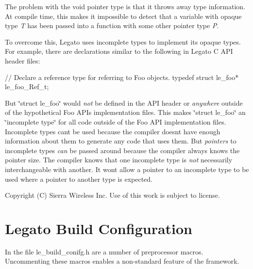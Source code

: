 The problem with the void pointer type is that it throws away type information. At compile time, this makes it impossible to detect that a variable with opaque type {\itshape T} has been passed into a function with some other pointer type {\itshape P}.

To overcome this, Legato uses incomplete types to implement its opaque types. For example, there are declarations similar to the following in Legato C A\+P\+I header files\+:


\begin{DoxyCode}
\textcolor{comment}{// Declare a reference type for referring to Foo objects.}
\textcolor{keyword}{typedef} \textcolor{keyword}{struct }le\_foo* le\_foo\_Ref\_t;
\end{DoxyCode}


But \char`\"{}struct le\+\_\+foo\char`\"{} would {\itshape not} be defined in the A\+P\+I header or {\itshape anywhere} outside of the hypothetical Foo A\+P\+I\textquotesingle{}s implementation files. This makes \char`\"{}struct le\+\_\+foo\char`\"{} an \char`\"{}incomplete type\char`\"{} for all code outside of the Foo A\+P\+I implementation files. Incomplete types can\textquotesingle{}t be used because the compiler doesn\textquotesingle{}t have enough information about them to generate any code that uses them. But {\itshape pointers} to incomplete types {\itshape can} be passed around because the compiler always knows the pointer size. The compiler knows that one incomplete type is {\itshape not} necessarily interchangeable with another. It won\textquotesingle{}t allow a pointer to an incomplete type to be used where a pointer to another type is expected.





Copyright (C) Sierra Wireless Inc. Use of this work is subject to license. \hypertarget{c_le_build_cfg}{}\section{Legato Build Configuration}\label{c_le_build_cfg}
In the file {\ttfamily le\+\_\+build\+\_\+conifg.\+h} are a number of preprocessor macros. Uncommenting these macros enables a non-\/standard feature of the framework.



